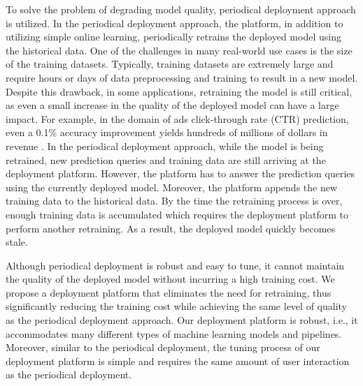 To solve the problem of degrading model quality, periodical deployment approach is utilized.
In the periodical deployment approach, the platform, in addition to utilizing simple online learning, periodically retrains the deployed model using the historical data.
One of the challenges in many real-world use cases is the size of the training datasets.
Typically, training datasets are extremely large and require hours or days of data preprocessing and training to result in a new model.
Despite this drawback, in some applications, retraining the model is still critical, as even a small increase in the quality of the deployed model can have a large impact.
For example, in the domain of ads click-through rate (CTR) prediction, even a 0.1\% accuracy improvement yields hundreds of millions of dollars in revenue \cite{ling2017model}.
In the periodical deployment approach, while the model is being retrained, new prediction queries and training data are still arriving at the deployment platform.
However, the platform has to answer the prediction queries using the currently deployed model.
Moreover, the platform appends the new training data to the historical data.
By the time the retraining process is over, enough training data is accumulated which requires the deployment platform to perform another retraining.
As a result, the deployed model quickly becomes stale.

Although periodical deployment is robust and easy to tune, it cannot maintain the quality of the deployed model without incurring a high training cost.
We propose a deployment platform that eliminates the need for retraining, thus significantly reducing the training cost while achieving the same level of quality as the periodical deployment approach.
Our deployment platform is robust, i.e., it accommodates many different types of machine learning models and pipelines.
Moreover, similar to the periodical deployment, the tuning process of our deployment platform is simple and requires the same amount of user interaction as the periodical deployment.



